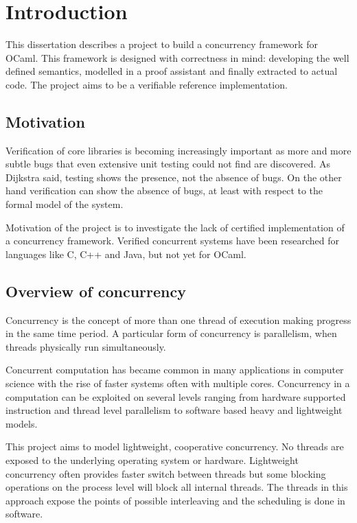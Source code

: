 \documentclass[12pt,twoside,notitlepage]{report}
\begin{document}
\cleardoublepage        %

\setcounter{page}{1}
\pagestyle{headings}
\chapter{Introduction}

This dissertation describes a project to build a concurrency framework for OCaml. This framework is designed with correctness in mind: developing the well defined semantics, modelled in a proof assistant and finally extracted to actual code. The project aims to be a verifiable reference implementation. 

\section{Motivation}
Verification of core libraries is becoming increasingly important as more and more subtle bugs that even extensive unit testing could not find are discovered. As Dijkstra said, testing shows the presence, not the absence of bugs. On the other hand verification can show the absence of bugs, at least with respect to the formal model of the system.

Motivation of the project is to investigate the lack of certified implementation of a concurrency framework. Verified concurrent systems have been researched for languages like C\cite{sevvcik2011relaxed}, C++ and Java\cite{lochbihler2012machine}, but not yet for OCaml. 

\section{Overview of concurrency}
Concurrency is the concept of more than one thread of execution making progress in the same time period. A particular form of concurrency is parallelism, when threads physically run simultaneously.

Concurrent computation has became common in many applications in computer science with the rise of faster systems often with multiple cores. Concurrency in a computation can be exploited on several levels ranging from hardware supported instruction and thread level parallelism to software based heavy and lightweight models. 

This project aims to model lightweight, cooperative concurrency. No threads are exposed to the underlying operating system or hardware. Lightweight concurrency often provides faster switch between threads  but some blocking operations on the process level will block all internal threads. The threads in this approach expose the points of possible interleaving and the scheduling is done in software.
\end{document}
